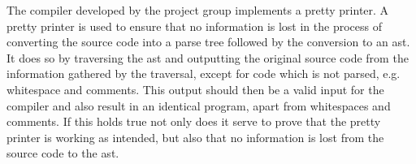The compiler developed by the project group implements a pretty printer.
A pretty printer is used to ensure that no information is lost in the process of converting the source code into a parse tree followed by the conversion to an \acrshort{ast}.
It does so by traversing the \acrshort{ast} and outputting the original source code from the information gathered by the traversal, except for code which is not parsed, e.g. whitespace and comments.
This output should then be a valid input for the compiler and also result in an identical program, apart from whitespaces and comments.
If this holds true not only does it serve to prove that the pretty printer is working as intended, but also that no information is lost from the source code to the \acrshort{ast}.